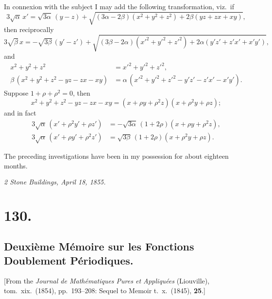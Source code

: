 \documentclass[11pt,a4paper]{article}
\begin{document}
\medskip

In connexion with the subject I may add the following transformation, viz.\ if
\[
3 \sqrt{\alpha}\, x' = \sqrt{3 \alpha}\,(y - z) + \sqrt{(3 \alpha - 2 \beta)(x^2 + y^2 + z^2) + 2 \beta (yz + zx + xy)},
\]
then reciprocally
\[
3 \sqrt{\beta}\, x = - \sqrt{3 \beta}\,(y' - z') + \sqrt{(3 \beta - 2 \alpha)(x'^2 + y'^2 + z'^2) + 2 \alpha (y'z' + z'x' + x'y')},
\]
and
\begin{align*}
x^2 + y^2 + z^2 &= x'^2 + y'^2 + z'^2,\\
\beta\,(x^2 + y^2 + z^2 - yz - zx - xy) &= \alpha\,(x'^2 + y'^2 + z'^2 - y'z' - z'x' - x'y').
\end{align*}
Suppose $1 + \rho + \rho^2 = 0$, then
\[
x^2 + y^2 + z^2 - yz - zx - xy = (x + \rho y + \rho^2 z)(x + \rho^2 y + \rho z);
\]
and in fact
\begin{align*}
3 \sqrt{\alpha}\,(x' + \rho^2 y' + \rho z') &= - \sqrt{3 \alpha}\,(1 + 2\rho)(x + \rho y + \rho^2 z),\\
3 \sqrt{\alpha}\,(x' + \rho y' + \rho^2 z') &= \sqrt{3 \beta}\,(1 + 2\rho)(x + \rho^2 y + \rho z).
\end{align*}

\medskip

The preceding investigations have been in my possession for about eighteen months.

\medskip
\noindent\textit{2 Stone Buildings, April 18, 1855.}

\section*{130.}
\subsection*{Deuxi\`eme M\'emoire sur les Fonctions Doublement P\'eriodiques.}


[From the \textit{Journal de Math\'ematiques Pures et Appliqu\'ees} (Liouville), tom.\ xix.\ (1854), pp.\ 193--208: Sequel to Memoir t.~x.\ (1845), \textbf{25}.]

\medskip
\end{document}

